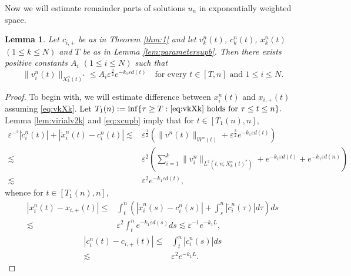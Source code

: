 \documentclass[11pt]{amsart}
\newtheorem{lemma}[theorem]{Lemma}
\theoremstyle{remark}
\numberwithin{equation}{section}
\begin{document}
Now we will estimate remainder parts of solutions $u_n$ in exponentially
weighted space. 
\begin{lemma}
\label{lem:vNXN}
 Let $c_{i,+}$ be as in Theorem \ref{thm:1} and let $v_k^n(t)$, $c_k^n(t)$,
$x_k^n(t)$ $(1\le k\le N)$ and $T$ be as in Lemma \ref{lem:parametersupb}.
Then there exists positive constants $A_i$ $(1\le i\le N)$ such that
  \begin{equation}
    \label{eq:vkXk}
\|v_i^n(t)\|_{X_k^n(t)^*}\le A_i{\varepsilon}^{\frac32}e^{-k_1{\varepsilon} d(t)}
\quad\text{for every $t\in [T,n]$ and $1\le i\le N$.}
  \end{equation}
\end{lemma}
\begin{proof}
To begin with, we will estimate difference between $x_i^n(t)$ and $x_{i,+}(t)$
assuming \eqref{eq:vkXk}.
Let $T_1(n):=\inf\{\tau\ge T:\text{\eqref{eq:vkXk} holds for
$\tau \le t \le n$}\}.$ 
Lemma \ref{lem:virialv2k} and \eqref{eq:xcupb} imply that for $t\in[T_1(n),n]$,
\begin{align*}
  {\varepsilon}^{-^3}|\dot{c}_i^n(t)|+|\dot{x}_i^n(t)-c_i^n(t)|
\lesssim &
{\varepsilon}^{\frac12}(\|v^n(t)\|_{W^n(t)}+{\varepsilon}^{\frac32}e^{-k_1{\varepsilon} d(t)})
\\ \lesssim & {\varepsilon}^2\left(\sum_{i=1}^k \|v_i^n\|_{L^2(t,n;X_k^n(t)^*)}
+ e^{-k_1{\varepsilon} d(t)}+e^{-k_1{\varepsilon} d(n)}\right)
\\ \lesssim & {\varepsilon}^2e^{-k_1{\varepsilon} d(t)},
\end{align*}
whence for $t\in[T_1(n),n]$,
\begin{equation}
  \label{eq:diffx+xi}
  \begin{split}
|x_i^n(t)-x_{i,+}(t)|\le & \int^n_t
\left(|\dot{x}_i^n(s)-c_i^n(s)|+
\int_s^n|\dot{c}_i^n(\tau)|d\tau\right)ds
\\ \lesssim & {\varepsilon}^2\int_t^n e^{-k_1{\varepsilon} d(s)}ds \lesssim {\varepsilon}^{-1}e^{-k_1L},
\end{split}
\end{equation}
\begin{equation}
  \label{eq:diffc+ci}
  \begin{split}
|c_i^n(t)-c_{i,+}(t)|\le & \int^n_t|\dot{c}_i^n(s)|ds
\\ \lesssim & {\varepsilon}^2e^{-k_1L}.
\end{split}
\end{equation}
\par


\end{proof}
\end{document}
